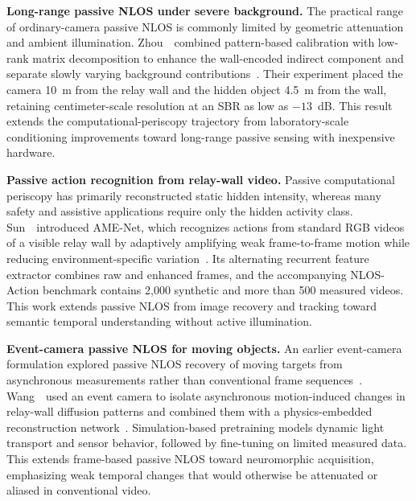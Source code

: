 \vspace{0.8mm}
\noindent \textbf{Long-range passive NLOS under severe background.}
The practical range of ordinary-camera passive NLOS is commonly limited by geometric attenuation and ambient illumination. Zhou~\etal~combined pattern-based calibration with low-rank matrix decomposition to enhance the wall-encoded indirect component and separate slowly varying background contributions~\cite{zhouPassiveNLOS10m2025}. Their experiment placed the camera 10~m from the relay wall and the hidden object 4.5~m from the wall, retaining centimeter-scale resolution at an SBR as low as $-13$~dB. This result extends the computational-periscopy trajectory from laboratory-scale conditioning improvements toward long-range passive sensing with inexpensive hardware.

\vspace{0.8mm}
\noindent \textbf{Passive action recognition from relay-wall video.}
Passive computational periscopy has primarily reconstructed static hidden intensity, whereas many safety and assistive applications require only the hidden activity class. Sun~\etal~introduced AME-Net, which recognizes actions from standard RGB videos of a visible relay wall by adaptively amplifying weak frame-to-frame motion while reducing environment-specific variation~\cite{sunAdaptiveMotionNLOS2025}. Its alternating recurrent feature extractor combines raw and enhanced frames, and the accompanying NLOS-Action benchmark contains 2,000 synthetic and more than 500 measured videos. This work extends passive NLOS from image recovery and tracking toward semantic temporal understanding without active illumination.

\vspace{0.8mm}
\noindent \textbf{Event-camera passive NLOS for moving objects.}
An earlier event-camera formulation explored passive NLOS recovery of moving targets from asynchronous measurements rather than conventional frame sequences~\cite{wangEventCameraNLOS2022}. Wang~\etal~used an event camera to isolate asynchronous motion-induced changes in relay-wall diffusion patterns and combined them with a physics-embedded reconstruction network~\cite{wangEventEnhancedPassiveNLOS2024}. Simulation-based pretraining models dynamic light transport and sensor behavior, followed by fine-tuning on limited measured data. This extends frame-based passive NLOS toward neuromorphic acquisition, emphasizing weak temporal changes that would otherwise be attenuated or aliased in conventional video.

